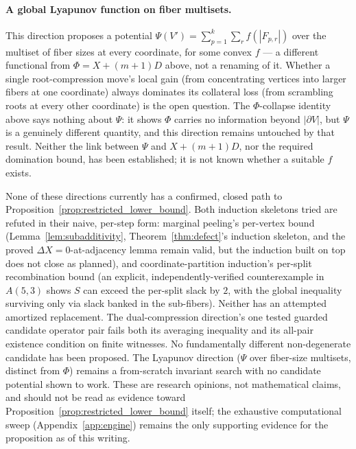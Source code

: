 \paragraph{A global Lyapunov function on fiber multisets.}
This direction proposes a potential $\Psi(V') = \sum_{p=1}^k \sum_r
f(|F_{p,r}|)$ over the multiset of fiber sizes at every coordinate, for
some convex $f$ --- a different functional from $\Phi=X+(m+1)D$ above,
not a renaming of it. Whether a single root-compression move's local
gain (from concentrating vertices into larger fibers at one coordinate)
always dominates its collateral loss (from scrambling roots at every
other coordinate) is the open question. The $\Phi$-collapse identity
above says nothing about $\Psi$: it shows $\Phi$ carries no information
beyond $|\partial V|$, but $\Psi$ is a genuinely different quantity, and
this direction remains untouched by that result. Neither the link
between $\Psi$ and $X+(m+1)D$, nor the required domination bound, has
been established; it is not known whether a suitable $f$ exists.

\medskip
\noindent None of these directions currently has a confirmed, closed
path to Proposition~\ref{prop:restricted_lower_bound}. Both induction skeletons
tried are refuted in their naive, per-step form: marginal peeling's
per-vertex bound (Lemma~\ref{lem:subadditivity},
Theorem~\ref{thm:defect}'s induction skeleton, and the proved
$\Delta X=0$-at-adjacency lemma remain valid, but the induction built on
top does not close as planned), and coordinate-partition induction's
per-split recombination bound (an explicit, independently-verified
counterexample in $A(5,3)$ shows $S$ can exceed the per-split slack by
$2$, with the global inequality surviving only via slack banked in the
sub-fibers). Neither has an attempted amortized replacement. The
dual-compression direction's one tested guarded candidate operator pair
fails both its averaging inequality and its all-pair existence condition on
finite witnesses. No fundamentally different non-degenerate candidate has
been proposed.
The Lyapunov direction ($\Psi$ over fiber-size multisets, distinct from
$\Phi$) remains a from-scratch invariant search with no candidate
potential shown to work. These are research opinions, not mathematical
claims, and should not be read as evidence toward
Proposition~\ref{prop:restricted_lower_bound} itself; the exhaustive computational
sweep (Appendix~\ref{app:engine}) remains the only supporting evidence
for the proposition as of this writing.

